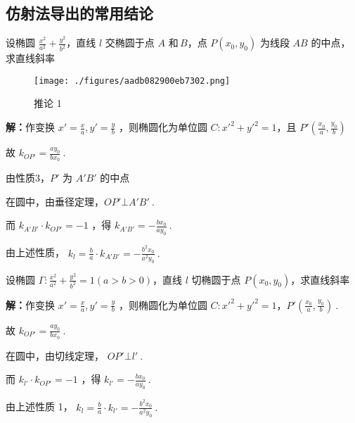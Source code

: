 \subsection{仿射法导出的常用结论}
\begin{corollary}{}
设椭圆 $\displaystyle{\frac{x^2}{a^2}+\frac{y^2}{b^2}}$，直线 $\displaystyle{l}$ 交椭圆于点 $\displaystyle{A}$ 和\,$\displaystyle{B}$，点 $\displaystyle{P(x_0,y_0)}$ 为线段 $\displaystyle{AB}$ 的中点，求直线斜率
\begin{figure}[ht]
\centering
\texttt{[image: ./figures/aadb082900eb7302.png]}
\caption{推论 1} \label{fig_affine_1}
\end{figure}

\textbf{解：}作变换 $\displaystyle{x'=\frac{x}{a},y'=\frac{y}{b}}$ ，则椭圆化为单位圆 $\displaystyle{C:x'^2+y'^2=1}$，且 $\displaystyle{P'\left(\frac{x_0}{a},\frac{y_0}{b}\right)}$

故 $\displaystyle{k_{OP'}=\frac{ay_0}{bx_0}}~.$

由性质3，$\displaystyle{P'}$ 为 $\displaystyle{A'B'}$ 的中点

在圆中，由垂径定理，$\displaystyle{OP'\bot A'B'}~.$

而 $\displaystyle{k_{A'B'}\cdot k_{OP'}=-1}$ ，得 $\displaystyle{k_{A'B'}=-\frac{bx_0}{ay_0}}~.$

由上述性质， $\displaystyle{k_l=\frac{b}{a}\cdot k_{A'B'}=-\frac{b^2x_0}{a^2y_0}}~.$
\end{corollary}
\begin{corollary}{}
设椭圆   $\displaystyle{\Gamma:\frac{x^2}{a^2}+\frac{y^2}{b^2}=1(a>b>0)}$，直线 $\displaystyle{l}$ 切椭圆于点 $\displaystyle{P(x_0,y_0)}$，求直线斜率 

\textbf{解：}作变换 $\displaystyle{x'=\frac{x}{a},y'=\frac{y}{b}}$ ，则椭圆化为单位圆 $\displaystyle{C:x'^2+y'^2=1}$，$\displaystyle{P'\left(\frac{x_0}{a},\frac{y_0}{b}\right)}~.$ 

故  $\displaystyle{k_{OP'}=\frac{ay_0}{bx_0}}~.$ 

在圆中，由切线定理， $\displaystyle{OP'\bot l'}~.$ 

而  $\displaystyle{k_{l'}\cdot k_{OP'}=-1}$ ，得 $\displaystyle{k_{l'}=-\frac{bx_0}{ay_0}}~.$ 

由上述性质 1， $\displaystyle{k_l=\frac{b}{a}\cdot k_{l'}=-\frac{b^2x_0}{a^2y_0}}~.$ 

\end{corollary}

